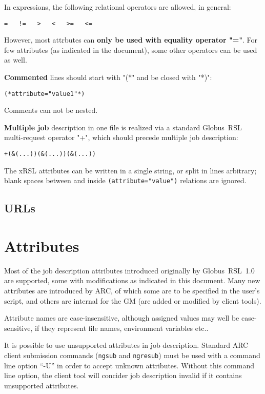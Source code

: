 \documentclass{book}
\newcommand{\globus}{Globus\textsuperscript{\textregistered}}
\begin{document}
  In expressions, the following relational operators are allowed, in general:
  \begin{shaded}
    \verb#=   !=   >   <   >=   <=#
  \end{shaded}
  However, most attrbutes can \textbf{only be used with equality operator "="}. For few attributes (as indicated in the document), some other operators can be used as well.

  \textbf{Commented} lines should start with "(*" and be
  closed with "*)":
  \begin{shaded}
    \verb#(*attribute="value1"*)#
  \end{shaded}
  Comments can not be nested.

  \textbf{Multiple job} description in one file is realized via a standard
  \globus\  RSL multi-request operator "+", which should precede
  multiple job description:
  \begin{shaded}
    \verb#+(&(...))(&(...))(&(...))#
  \end{shaded}

  The xRSL attributes can be written in a single string, or split in
  lines arbitrary; blank spaces between and inside
  \verb#(attribute="value")# relations are ignored.

  \section{URLs}
  \label{sec:url}

  

  \chapter{Attributes}
  \label{sec:attributes}

  Most of the job description attributes  introduced originally by \globus\ RSL~1.0 are
  supported, some with modifications as indicated in this
  document. Many new attributes are introduced by ARC, of which some are
  to be specified in the user's script, and others are internal for
  the GM (are added or modified by client tools).

  Attribute names are case-insensitive, although assigned values may
  well be case-sensitive, if they represent file names, environment
  variables etc..

  It is possible to use unsupported attributes in job description. Standard ARC client submission commands (\texttt{ngsub} and \texttt{ngresub}) must be used with a command line option ``-U'' in order to accept unknown attributes. Without this command line option, the client tool will concider job description invalid if it contains unsupported attributes.
\end{document}
